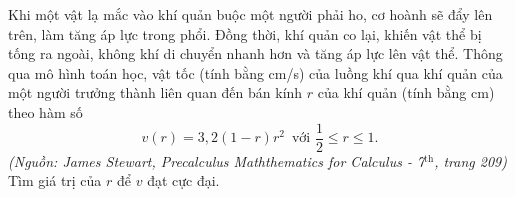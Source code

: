 \begin{bt}%
	Khi một vật lạ mắc vào khí quản buộc một người phải ho, cơ hoành sẽ đẩy lên trên, làm tăng áp lực trong phổi. Đồng thời, khí quản co lại, khiến vật thể bị tống ra ngoài, không khí di chuyển nhanh hơn và tăng áp lực lên vật thể. Thông qua mô hình toán học, vật tốc (tính bằng cm/s) của luồng khí qua khí quản của một người trưởng thành liên quan đến bán kính $r$ của khí quản (tính bằng cm) theo hàm số 
	$$v(r)=3{,}2(1-r)r^2\, \text{ với }\dfrac{1}{2}\le r\le 1.$$
	\textit{(Nguồn: James Stewart, Precalculus Maththematics for Calculus - 7$^\text{th}$, trang 209)}\\
	Tìm giá trị của $r$ để $v$ đạt cực đại.
\end{bt}


